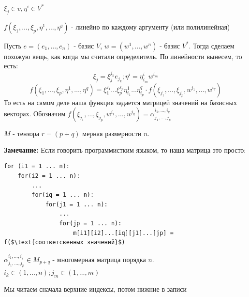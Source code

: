 $\xi_j \in v, \eta^i \in V^*$

$f(\xi_1,\ldots,\xi_p,\eta^1,\ldots, \eta^q)$ - линейно по каждому аргументу (или полилинейная)

Пусть $e = (e_1,\ldots, e_n)$ - базис $V$, $w = (w^1,\ldots, w^n)$ - базис $V^*$. Тогда сделаем похожую вещь, как когда мы считали определитель. По линейности вынесем, то есть:
$$\xi_j = \xi_j^{j_k}e_{j_k};\eta^i = \eta_{i_m}^iw^{i_m}$$
$$f(\xi_1,\ldots,\xi_p,\eta^1,\ldots, \eta^q) = \xi_1^{j_1}\ldots\xi_p^{j_p}\eta_{i_1}^1 \ldots \eta^q_{i_p} \cdot f(\xi_{j_1},\ldots, \xi_{j_p},w^{i_1},\ldots, w^{i_q})$$
То есть  на самом деле наша функция задается матрицей значений на базисных векторах. Обозначим $f(\xi_{j_1},\ldots, \xi_{j_p},w^{i_1},\ldots, w^{i_q}) = \alpha_{j_1,\ldots,j_p}^{i_1,\ldots,i_q}$

 $M$ -  тензора $r = (p+q)$ мерная  размерности $n$. 

\textbf{Замечание:} Если говорить программистким языком, то наша матрица это просто:

\begin{lstlisting}[mathescape]
for (i1 = 1 ... n):
    for(i2 = 1 ... n):
        ...
        for(iq = 1 ... n):
            for(j1 = 1 ... n):
                ...
                for(jp = 1 ... n):
                    m[i1][i2]...[iq][j1]...[jp] = f($\text{соответсвенных значений}$)
\end{lstlisting}


$\alpha^{i_1,\ldots,i_q}_{j_1,\ldots, j_p} \in M_{p+q}$ - многомерная матрица порядка $n$. $i_k \in (1,\ldots,n); j_m \in (1,\ldots, m)$

Мы читаем сначала верхние индексы, потом нижние в записи


